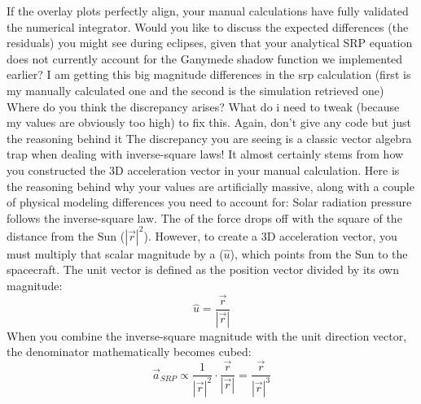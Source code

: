{}If the overlay plots perfectly align, your manual calculations have fully validated the numerical integrator.\markdownRendererInterblockSeparator
{}Would you like to discuss the expected differences (the residuals) you might see during eclipses, given that your analytical SRP equation does not currently account for the Ganymede shadow function we implemented earlier?\markdownRendererInterblockSeparator
{}\markdownRendererThematicBreak{}\markdownRendererInterblockSeparator
{}
\markdownRendererSectionEnd \markdownRendererSectionBegin
{}\markdownRendererInterblockSeparator
{}I am getting this big magnitude differences in the srp calculation (first is my manually calculated one and the second is the simulation retrieved one) Where do you think the discrepancy arises? What do i need to tweak (because my values are obviously too high) to fix this. Again, don't give any code but just the reasoning behind it\markdownRendererInterblockSeparator
{}
\markdownRendererSectionEnd \markdownRendererSectionBegin
{}\markdownRendererInterblockSeparator
{}The discrepancy you are seeing is a classic vector algebra trap when dealing with inverse-square laws! It almost certainly stems from how you constructed the 3D acceleration vector in your manual calculation.\markdownRendererInterblockSeparator
{}Here is the reasoning behind why your values are artificially massive, along with a couple of physical modeling differences you need to account for:\markdownRendererInterblockSeparator
{}\markdownRendererSectionBegin
{}\markdownRendererInterblockSeparator
{}Solar radiation pressure follows the inverse-square law. The  of the force drops off with the square of the distance from the Sun ($|\vec{r}|^2$).\markdownRendererInterblockSeparator
{}However, to create a 3D acceleration vector, you must multiply that scalar magnitude by a  ($\hat{u}$), which points from the Sun to the spacecraft. The unit vector is defined as the position vector divided by its own magnitude:\markdownRendererInterblockSeparator
{}$$\hat{u} = \frac{\vec{r}}{|\vec{r}|}$$\markdownRendererInterblockSeparator
{}When you combine the inverse-square magnitude with the unit direction vector, the denominator mathematically becomes cubed:\markdownRendererInterblockSeparator
{}$$\vec{a}_{SRP} \propto \frac{1}{|\vec{r}|^2} \cdot \frac{\vec{r}}{|\vec{r}|} = \frac{\vec{r}}{|\vec{r}|^3}$$\markdownRendererInterblockSeparator
